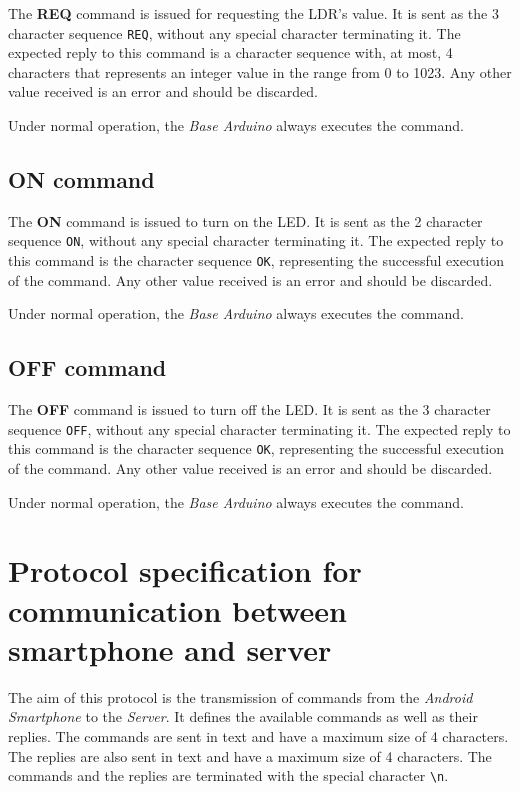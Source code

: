 \documentclass[conference, a4paper]{IEEEtran}
\begin{document}
The \textbf{REQ} command is issued for requesting the LDR's value. It is sent as the 3 character sequence \texttt{REQ}, without any special character terminating it. The expected reply to this command is a character sequence with, at most, 4 characters that represents an integer value in the range from 0 to 1023. Any other value received is an error and should be discarded.

Under normal operation, the \textit{Base Arduino} always executes the command.

\subsection{ON command}

The \textbf{ON} command is issued to turn on the LED. It is sent as the 2 character sequence \texttt{ON}, without any special character terminating it. The expected reply to this command is the character sequence \texttt{OK}, representing the successful execution of the command. Any other value received is an error and should be discarded.

Under normal operation, the \textit{Base Arduino} always executes the command.

\subsection{OFF command}

The \textbf{OFF} command is issued to turn off the LED. It is sent as the 3 character sequence \texttt{OFF}, without any special character terminating it. The expected reply to this command is the character sequence \texttt{OK}, representing the successful execution of the command. Any other value received is an error and should be discarded.

Under normal operation, the \textit{Base Arduino} always executes the command.

\section{Protocol specification for communication between smartphone and server}
\label{prot_smart}

The aim of this protocol is the transmission of commands from the \textit{Android Smartphone} to the \textit{Server}. It defines the available commands as well as their replies. The commands are sent in text and have a maximum size of 4 characters. The replies are also sent in text and have a maximum size of 4 characters. The commands and the replies are terminated with the special character \texttt{\textbackslash n}.
\end{document}
